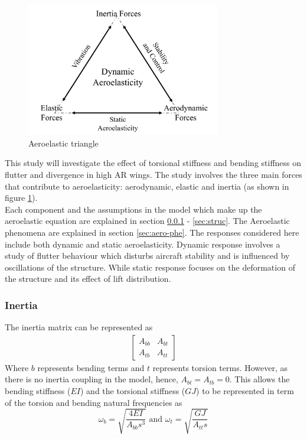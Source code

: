 \documentclass[11pt]{article}
\begin{document}
\begin{figure}
    \includegraphics[width=8.5cm]{figures/aerotri.png}
    \caption{Aeroelastic triangle}
    \label{fig:aero-tri}
\end{figure} 

This study will investigate the effect of torsional stiffness and bending stiffness on flutter and divergence in high AR wings. The study involves the three main forces that contribute to aeroelasticity: aerodynamic, elastic and inertia (as shown in figure \ref{fig:aero-tri}).\\

Each component and the assumptions in the model which make up the aeroelastic equation are explained in section \ref{sec:inertia} - \ref{sec:struc}. The Aeroelastic phenomena are explained in section \ref{sec:aero-phe}. The responses considered here include both dynamic and static aeroelasticity. Dynamic response involves a study of flutter behaviour which disturbs aircraft stability and is influenced by oscillations of the structure. While static response focuses on the deformation of the structure and its effect of lift distribution.
\newpage
\subsubsection{Inertia}
\label{sec:inertia}
The inertia matrix can be represented as 
\begin{gather*}
    \begin{bmatrix}A_{bb} & A_{bt} \\ A_{tb} & A_{tt} \end{bmatrix}
\end{gather*}
Where $b$ represents bending terms and $t$ represents torsion terms. However, as there is no inertia coupling in the model, hence, $A_{bt} = A_{tb} = 0$. This allows the bending stiffness ($EI$) and the torsional stiffness ($GJ$) to be represented in term of the torsion and bending natural frequencies as
\begin{equation}
    \omega_b = \sqrt{\frac{4EI}{A_{bb}s^3}} \text{ and } \omega_t = \sqrt{\frac{GJ}{A_{tt}s}}
\end{equation}
\end{document}
